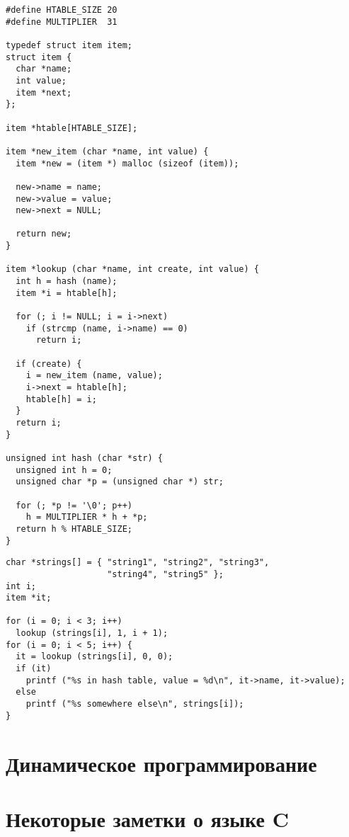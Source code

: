 \lstset{label=lst:htable-impl,caption=Некоторые операции}
\begin{lstlisting}
#define HTABLE_SIZE 20
#define MULTIPLIER  31

typedef struct item item;
struct item {
  char *name;
  int value;
  item *next;
};

item *htable[HTABLE_SIZE];

item *new_item (char *name, int value) {
  item *new = (item *) malloc (sizeof (item));

  new->name = name;
  new->value = value;
  new->next = NULL;

  return new;
}

item *lookup (char *name, int create, int value) {
  int h = hash (name);
  item *i = htable[h];

  for (; i != NULL; i = i->next)
    if (strcmp (name, i->name) == 0)
      return i;

  if (create) {
    i = new_item (name, value);
    i->next = htable[h];
    htable[h] = i;
  }
  return i;
}

unsigned int hash (char *str) {
  unsigned int h = 0;
  unsigned char *p = (unsigned char *) str;

  for (; *p != '\0'; p++)
    h = MULTIPLIER * h + *p;
  return h % HTABLE_SIZE;
}
\end{lstlisting}

\lstset{label=lst:htable-usage,caption=Пример использования}
\begin{lstlisting}
char *strings[] = { "string1", "string2", "string3",
                    "string4", "string5" };
int i;
item *it;

for (i = 0; i < 3; i++)
  lookup (strings[i], 1, i + 1);
for (i = 0; i < 5; i++) {
  it = lookup (strings[i], 0, 0);
  if (it)
    printf ("%s in hash table, value = %d\n", it->name, it->value);
  else
    printf ("%s somewhere else\n", strings[i]);
}
\end{lstlisting}

\section{Динамическое программирование}
\label{sec:dyn-programming}

\section{Некоторые заметки о языке C}
\label{sec:c-notes}

